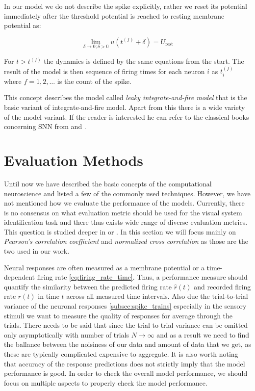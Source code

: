 In our model we do not describe the spike explicitly, rather we reset its potential immediately after the threshold potential is reached to resting membrane potential as:

\begin{equation}
    \lim_{\delta \to 0; \delta > 0} u\left( t^{(f)} + \delta \right) = U_{\text{rest}}
\end{equation}
\label{eq:resting_potential}

For $t > t^{(f)}$ the dynamics is defined by the same equations from the start. The result of the model is then sequence of firing times for each neuron $i$ as $t^{(f)}_i$ where $f = 1, 2, \dots$ is the count of the spike.

This concept describes the model called \emph{leaky integrate-and-fire model} that is the basic variant of integrate-and-fire model. Apart from this there is a wide variety of the model variant. If the reader is interested he can refer to the classical books concerning SNN from \citet{dayan2005theoretical} and \citet{gerstner2002spiking}.

\section{Evaluation Methods}
\label{sec:evaluation_methods}
Until now we have described the basic concepts of the computational neuroscience and listed a few of the commonly used techniques. However, we have not mentioned how we evaluate the performance of the models. Currently, there is no consensus on what evaluation metric should be used for the visual system identification task and there thus exists wide range of diverse evaluation metrics. This question is studied deeper in \citet{pospisil2021eval} or \citet{Carandini10577}. In this section we will focus mainly on \emph{Pearson's correlation coefficient} and \emph{normalized cross correlation} as those are the two used in our work.

Neural responses are often measured as a membrane potential or a time-dependent firing rate \ref{eq:firing_rate_time}. Thus, a performance measure should quantify the similarity between the predicted firing rate $\hat{r}(t)$ and recorded firing rate $r(t)$ in time $t$ across all measured time intervals. Also due the trial-to-trial variance of the neuronal responses \ref{subsec:spike_trains} especially in the sensory stimuli we want to measure the quality of responses for average through the trials. There needs to be said that since the trial-to-trial variance can be omitted only asymptotically with number of trials $N \to \infty$ and as a result we need to find the ballance between the noisiness of our data and amount of data that we get, as these are typically complicated expensive to aggregate. It is also worth noting that accuracy of the response predictions does not strictly imply that the model performance is good. In order to check the overall model performance, we should focus on multiple aspects to properly check the model performance.

